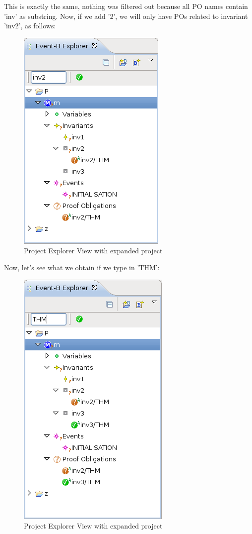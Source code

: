 This is exactly the same, nothing was filtered out because all PO names contain 'inv' as substring. Now, if we add '2', we will only have POs related to invariant 'inv2', as follows: 

\begin{figure}[!h]
\begin{center}
	\includegraphics{img/reference/ref_01_project_explorer6.png}
	\caption{Project Explorer View with expanded project}
	\label{fig_ref_01_project_explorer6}
\end{center}
\end{figure}

Now, let's see what we obtain if we type in 'THM': 

\begin{figure}[!h]
\begin{center}
	\includegraphics{img/reference/ref_01_project_explorer7.png}
	\caption{Project Explorer View with expanded project}
	\label{fig_ref_01_project_explorer7}
\end{center}
\end{figure}

